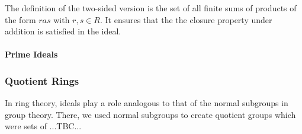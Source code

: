 The definition of the two-sided version is the set of all finite sums of products of the form $r a s$ with $r,s \in R$. It ensures that the the closure property under addition is satisfied in the ideal.%




\paragraph{Prime Ideals}











\subsubsection{Quotient Rings}
In ring theory, ideals play a role analogous to that of the normal subgroups in group theory. There, we used normal subgroups to create quotient groups which were sets of ...TBC...









